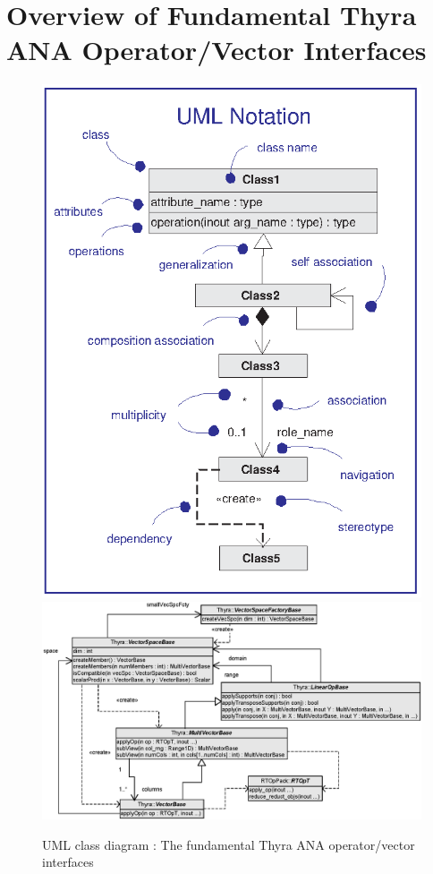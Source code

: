 \documentclass[pdf,ps2pdf,11pt]{SANDreport}
\begin{document}
%
\section{Overview of Fundamental Thyra ANA Operator/Vector Interfaces}
\label{thyra:sec:Thyra_core_overview}
%

{\bsinglespace
\begin{figure}[p]
\begin{center}
\includegraphics*[bb= 0.0in 0.0in 3.3in 4.4in,scale=0.40
]{UML1}
\includegraphics*[scale=0.65]{ThyraOperatorVector}
\end{center}
\caption{
\label{thyra:fig:basic_op_vec_itfc}
UML class diagram : The fundamental Thyra ANA operator/vector interfaces }
\end{figure}
\esinglespace}
\end{document}
